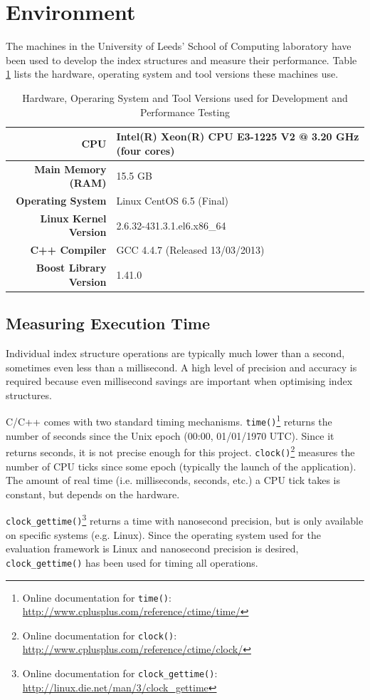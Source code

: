 \section{Environment}

The machines in the University of Leeds' School of Computing laboratory have been used to develop the index structures and measure their performance. Table \ref{tab:system-specifications} lists the hardware, operating system and tool versions these machines use.

\begin{table}
	\centering
	\begin{tabular}{|r|l|}
		\hline
		\textbf{CPU} & Intel(R) Xeon(R) CPU E3-1225 V2 @ 3.20 GHz (four cores) \\
		\hline
		\textbf{Main Memory (RAM)} & 15.5 GB \\
		\hline
		\textbf{Operating System} & Linux CentOS 6.5 (Final) \\
		\hline
		\textbf{Linux Kernel Version} & 2.6.32-431.3.1.el6.x86\_64 \\
		\hline
		\textbf{C++ Compiler} & GCC 4.4.7 (Released 13/03/2013) \\
		\hline
		\textbf{Boost Library Version} & 1.41.0 \\
		\hline
	\end{tabular}
	\caption{Hardware, Operaring System and Tool Versions used for Development and Performance Testing}
	\label{tab:system-specifications}
\end{table}

\subsection{Measuring Execution Time}

Individual index structure operations are typically much lower than a second, sometimes even less than a millisecond. A high level of precision and accuracy is required because even millisecond savings are important when optimising index structures.

C/C++ comes with two standard timing mechanisms. \texttt{time()}\footnote{Online documentation for \texttt{time()}: \url{http://www.cplusplus.com/reference/ctime/time/}} returns the number of seconds since the Unix epoch (00:00, 01/01/1970 UTC). Since it returns seconds, it is not precise enough for this project. \texttt{clock()}\footnote{Online documentation for \texttt{clock()}: \url{http://www.cplusplus.com/reference/ctime/clock/}}  measures the number of CPU ticks since some epoch (typically the launch of the application). The amount of real time (i.e. milliseconds, seconds, etc.) a CPU tick takes is constant, but depends on the hardware.

\texttt{clock\_gettime()}\footnote{Online documentation for \texttt{clock\_gettime()}: \url{http://linux.die.net/man/3/clock_gettime}} returns a time with nanosecond precision, but is only available on specific systems (e.g. Linux). Since the operating system used for the evaluation framework is Linux and nanosecond precision is desired, \texttt{clock\_gettime()} has been used for timing all operations.